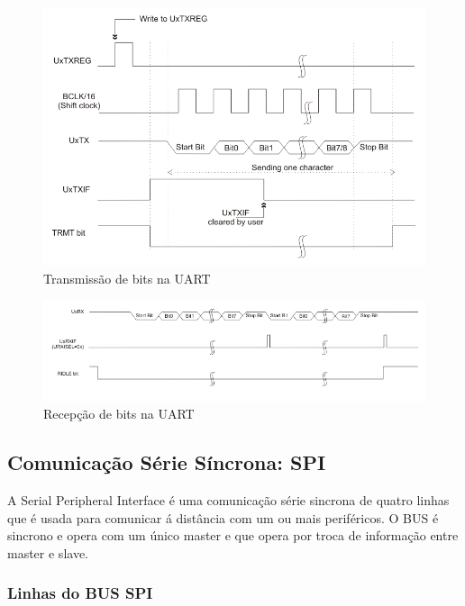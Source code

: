 \documentclass[10pt,a4paper]{paper}
\begin{document}
 	\begin{figure}[ht]
		\includegraphics[scale=0.35]{fig9.png}
		\centering
		\caption{Transmissão de bits na UART}
		\label{fig:figura9 }
	\end{figure}
	
 	\begin{figure}[ht]
		\includegraphics[scale=0.35]{fig10.png}
		\centering
		\caption{Recepção de bits na UART}
		\label{fig:figura10}
	\end{figure}

\subsection*{Comunicação Série Síncrona: SPI}
A Serial Peripheral Interface é uma comunicação série sincrona de quatro linhas que é usada para comunicar á distância com um ou mais periféricos.
O BUS é sincrono e opera com um único master e que opera por troca de informação entre master e slave.

\subsubsection*{Linhas do BUS SPI}
\end{document}
